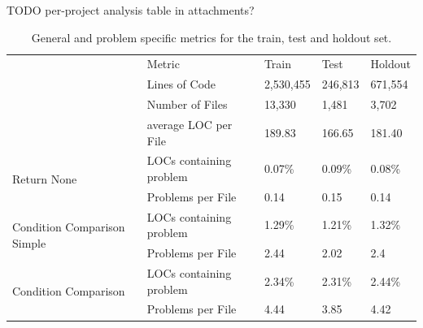 TODO per-project analysis table in attachments?

\begin{table}[]
    \tabcolsep=0.11cm
    \begin{tabularx}{\textwidth}{@{}llXXX@{}}
        \toprule
    \multirow{4}{*}{}                            & Metric                  & Train & Test & Holdout \\ \cmidrule(l){2-5} 
                                                 & Lines of Code           & 2,530,455 & 246,813 & 671,554 \\
                                                 & Number of Files         & 13,330  &  1,481 & 3,702   \\
                                                 & average LOC per File    & 189.83  & 166.65  & 181.40     \\ \midrule
    \multirow{2}{*}{Return None}                 & LOCs containing problem & 0.07\%  &  0.09\% & 0.08\%  \\
                                                 & Problems per File       & 0.14    & 0.15  & 0.14    \\ \midrule
    \multirow{2}{*}{Condition Comparison Simple} & LOCs containing problem & 1.29\%  &  1.21\%  & 1.32\%  \\
                                                 & Problems per File       & 2.44    & 2.02 & 2.4    \\ \midrule
    \multirow{2}{*}{Condition Comparison}        & LOCs containing problem & 2.34\%  & 2.31\%  & 2.44\%  \\
                                                 & Problems per File       & 4.44    & 3.85  & 4.42    \\ \bottomrule
    \end{tabularx}
    \caption{General and problem specific metrics for the train, test and holdout set.}
    \label{tab:general_data_distribution}
\end{table}

